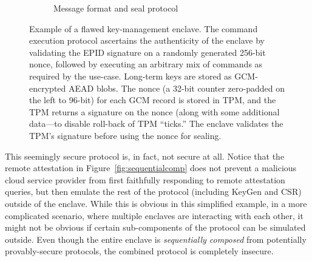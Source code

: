 \documentclass[letterpaper]{article}
\begin{document}
\begin{figure}[h]
\begin{subfigure}[b]{.5\textwidth}
    \caption{Message format and seal protocol}
    \label{fig:sealprotocol}
  \end{subfigure}
  \caption{Example of a flawed key-management enclave. The command
    execution protocol ascertains the authenticity of the enclave by
    validating the EPID signature on a randomly generated 256-bit
    nonce, followed by executing an arbitrary mix of commands as
    required by the use-case. Long-term keys are stored as
    GCM-encrypted AEAD blobs. The nonce (a 32-bit counter zero-padded
    on the left to 96-bit) for each GCM record is stored in TPM, and
    the TPM returns a signature on the nonce (along with some
    additional data---to disable roll-back of TPM ``ticks.'' The
    enclave validates the TPM's signature before using the nonce for
    sealing.}
  \label{fig:usecase}
  \end{figure}

  This seemingly secure protocol is, in fact, not secure at
  all. Notice that the remote attestation in
  Figure~\ref{fig:sequentialcomp} does not prevent a malicious cloud
  service provider from first faithfully responding to remote
  attestation queries, but then emulate the rest of the protocol
  (including \textsf{KeyGen} and CSR) outside of the enclave. While
  this is obvious in this simplified example, in a more complicated
  scenario, where multiple enclaves are interacting with each other,
  it might not be obvious if certain sub-components of the protocol
  can be simulated outside. Even though the entire enclave is
  \textit{sequentially composed} from potentially provably-secure
  protocols, the combined protocol is completely insecure.
\end{document}
